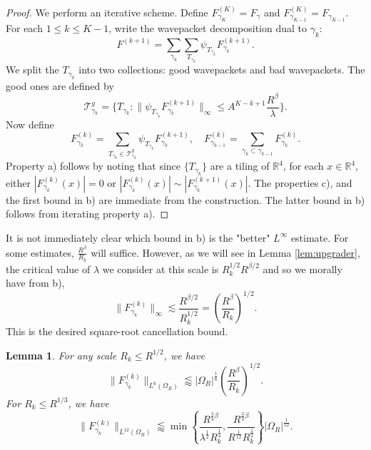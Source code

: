 \documentclass[12pt]{amsart}
\newtheorem{lemma}[theorem]{Lemma}
\providecommand{\R}{\mathbb R}
\providecommand{\T}{\mathcal{T}}
\begin{document}
\begin{proof}
    We perform an iterative scheme. Define $F_{\gamma_{K}}^{(K)}= F_\gamma$ and $F_{\gamma_{K-1}}^{(K)}= F_{\gamma_{K-1}}$. For each $1\le k \le K-1$, write the wavepacket decomposition dual to $\gamma_{k}$: $$F^{(k+1)} = \sum_{\gamma_k} \sum_{T_{\gamma_k}}\psi_{T_{\gamma_k}}F_{\gamma_k}^{(k+1)}.$$ We split the $T_{\gamma_k}$ into two collections: good wavepackets and bad wavepackets. The good ones are defined by $$\T_{\gamma_k}^g = \{T_{\gamma_k}: \|\psi_{T_{\gamma_k}}F_{\gamma_k}^{(k+1)}\|_{\infty}\le A^{K-k+1} \frac{R^{\beta}}{\lambda}\}.$$ Now define $$F_{\gamma_k}^{(k)} = \sum_{T_{\gamma_k}\in \T_{\gamma_k}^g}\psi_{T_{\gamma_k}}F_{\gamma_k}^{(k+1)}, \quad F_{\gamma_{k-1}}^{(k)}=\sum_{\gamma_k \subset \gamma_{k-1}}F_{\gamma_k}^{(k)}.$$
    Property a) follows by noting that since $\{T_{\gamma_k}\}$ are a tiling of $\R^4$, for each $x\in \R^4$, either $|F^{(k)}_{\gamma_k}(x)|=0$ or $|F^{(k)}_{\gamma_k}(x)|\sim |F^{(k+1)}_{\gamma_k}(x)|.$
    The properties c), and the first bound in b) are immediate from the construction. The latter bound in b) follows from iterating property a). 
\end{proof}

It is not immediately clear which bound in b) is the "better" $L^{\infty}$ estimate. For some estimates, $\frac{R^\beta}{R_k}$ will suffice. However, as we will see in Lemma \ref{lem:upgrader}, the critical value of $\lambda$ we consider at this scale is $R_k^{1/2}R^{\beta/2}$ and so we morally have from b), $$\|F_{\gamma_k}^{(k)}\|_\infty \lesssim \frac{R^{\beta/2}}{R_k^{1/2}}= \left(\frac{R^{\beta}}{R_k}\right)^{1/2}.$$ This is the desired square-root cancellation bound.

\begin{lemma}\label{lem:L6andL12estimates}
 For any scale $R_k\le R^{1/2}$, we have
    $$\|F_{\gamma_k}^{(k)}\|_{L^{6}(\Omega_R)}\lessapprox |\Omega_R|^{\frac{1}{6}}\left(\frac{R^{\beta}}{R_k}\right)^{1/2}.$$
 For $R_k\le R^{1/3}$, we have $$\|F_{\gamma_k}^{(k)}\|_{L^{12}(\Omega_R)}\lessapprox \min \left\{\frac{R^{\frac{3}{4}\beta}}{\lambda^{\frac{1}{2}}R_k^{\frac{1}{4}}}, \frac{R^{\frac{3}{4}\beta}}{R^{\frac{1}{12}}R_k^{\frac{1}{2}}}\right\}|\Omega_R|^{\frac{1}{12}}.$$ 
\end{lemma}
\end{document}
